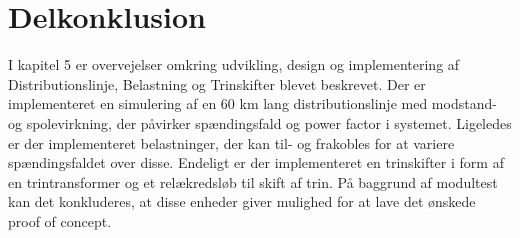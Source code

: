 

\section{Delkonklusion}

I kapitel 5 er overvejelser omkring udvikling, design og implementering af Distributionslinje, Belastning og Trinskifter blevet beskrevet. Der er implementeret en simulering af en 60 km lang distributionslinje med modstand- og spolevirkning, der påvirker spændingsfald og power factor i systemet. Ligeledes er der implementeret belastninger, der kan til- og frakobles for at variere spændingsfaldet over disse. Endeligt er der implementeret en trinskifter i form af en trintransformer og et relækredsløb til skift af trin. På baggrund af modultest kan det konkluderes, at disse enheder giver mulighed for at lave det ønskede proof of concept.


